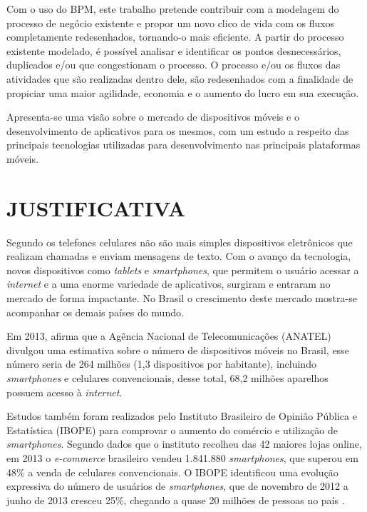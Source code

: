 \documentclass[
	12pt,				%
	openright,			%
	oneside,			%
	a4paper,			%
	chapter=TITLE,		%
	section=TITLE,		%
	english,			%
	french,				%
	spanish,			%
	brazil				%
	]{abntex2}
\begin{document}
Com o uso do BPM, este trabalho pretende contribuir com a modelagem do processo de negócio existente e propor um novo clico de vida com os fluxos completamente redesenhados, tornando-o mais eficiente. A partir do processo existente modelado, é possível analisar e identificar os pontos desnecessários, duplicados e/ou que congestionam o processo. O processo e/ou os fluxos das atividades que são realizadas dentro dele, são redesenhados com a finalidade de propiciar uma maior agilidade, economia e o aumento do lucro em sua execução.

Apresenta-se uma visão sobre o mercado de dispositivos móveis e o desenvolvimento de aplicativos para os mesmos, com um estudo a respeito das principais tecnologias utilizadas para desenvolvimento nas principais plataformas móveis.


\section{JUSTIFICATIVA}

Segundo  os telefones celulares não são mais simples dispositivos eletrônicos que realizam chamadas e enviam mensagens de texto. Com o avanço da tecnologia, novos dispositivos como \textit{tablets} e \textit{smartphones}, que permitem o usuário acessar a \textit{internet} e a uma enorme variedade de aplicativos, surgiram e entraram no mercado de forma impactante. No Brasil o crescimento deste mercado mostra-se acompanhar os demais países do mundo. 

Em 2013,  afirma que a Agência Nacional de Telecomunicações (ANATEL) divulgou uma estimativa sobre o número de dispositivos móveis no Brasil, esse número seria de 264 milhões (1,3 dispositivos por habitante), incluindo \textit{smartphones} e celulares convencionais, desse total, 68,2 milhões aparelhos possuem acesso à \textit{internet}.

Estudos também foram realizados pelo Instituto Brasileiro de Opinião Pública e Estatística (IBOPE) para comprovar o aumento do comércio e utilização de \textit{smartphones}. Segundo dados que o instituto recolheu das 42 maiores lojas online, em 2013 o \textit{e-commerce} brasileiro vendeu 1.841.880 \textit{smartphones}, que superou em 48\% a venda de celulares convencionais. O IBOPE identificou uma evolução expressiva do número de usuários de \textit{smartphones}, que de novembro de 2012 a junho de 2013 cresceu 25\%, chegando a quase 20 milhões de pessoas no país \cite{ibopeMobileEcommerce}.
\end{document}
